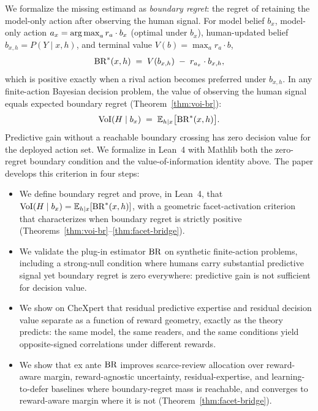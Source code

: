 We formalize the missing estimand as \emph{boundary regret}: the regret of retaining the model-only action after observing the human signal.
For model belief $b_x$, model-only action $a_x = \operatorname*{arg\,max}_a r_a \cdot b_x$ (optimal under $b_x$), human-updated belief $b_{x,h} = P(Y \mid x, h)$, and terminal value $V(b) = \max_a r_a \cdot b$,
\begin{equation}
  \operatorname{BR}^{*}(x, h) \;=\; V(b_{x,h}) \;-\; r_{a_x} \cdot b_{x,h},
\end{equation}
which is positive exactly when a rival action becomes preferred under $b_{x,h}$.
In any finite-action Bayesian decision problem, the value of observing the human signal equals expected boundary regret (Theorem~\ref{thm:voi-br}):
\begin{equation}
  \operatorname{VoI}(H \mid b_x) \;=\; \mathbb{E}_{h \mid x}\bigl[\operatorname{BR}^{*}(x, h)\bigr].
\end{equation}
Predictive gain without a reachable boundary crossing has zero decision value for the deployed action set.
We formalize in Lean~4 with Mathlib \citep{DeMouraUllrich2021,MathlibCommunity2020} both the zero-regret boundary condition and the value-of-information identity above.
The paper develops this criterion in four steps:
\begin{itemize}[nosep,leftmargin=1.5em]
  \item We define boundary regret and prove, in Lean~4, that $\operatorname{VoI}(H \mid b_x) = \mathbb{E}_{h \mid x}[\operatorname{BR}^{*}(x,h)]$, with a geometric facet-activation criterion that characterizes when boundary regret is strictly positive (Theorems~\ref{thm:voi-br}--\ref{thm:facet-bridge}).
  \item We validate the plug-in estimator $\operatorname{BR}$ on synthetic finite-action problems, including a strong-null condition where humans carry substantial predictive signal yet boundary regret is zero everywhere: predictive gain is not sufficient for decision value.
  \item We show on CheXpert that residual predictive expertise and residual decision value separate as a function of reward geometry, exactly as the theory predicts: the same model, the same readers, and the same conditions yield opposite-signed correlations under different rewards.
  \item We show that ex ante $\operatorname{BR}$ improves scarce-review allocation over reward-aware margin, reward-agnostic uncertainty, residual-expertise, and learning-to-defer baselines where boundary-regret mass is reachable, and converges to reward-aware margin where it is not (Theorem~\ref{thm:facet-bridge}).
\end{itemize}
